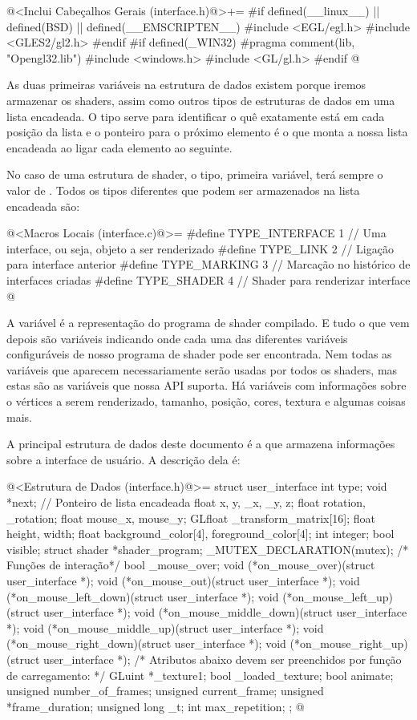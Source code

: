 \iniciocodigo
@<Inclui Cabeçalhos Gerais (interface.h)@>+=
#if defined(__linux__) || defined(BSD) || defined(__EMSCRIPTEN__)
#include <EGL/egl.h>
#include <GLES2/gl2.h>
#endif
#if defined(_WIN32)
#pragma comment(lib, "Opengl32.lib")
#include <windows.h>
#include <GL/gl.h>
#endif
@
\fimcodigo


As duas primeiras variáveis na estrutura de dados existem porque
iremos armazenar os shaders, assim como outros tipos de estruturas de
dados em uma lista encadeada. O tipo serve para identificar o quê
exatamente está em cada posição da lista e o ponteiro para o próximo
elemento é o que monta a nossa lista encadeada ao ligar cada elemento
ao seguinte.

No caso de uma estrutura de shader, o tipo, primeira variável, terá
sempre o valor de . Todos os tipos diferentes
que podem ser armazenados na lista encadeada são:

\iniciocodigo
@<Macros Locais (interface.c)@>=
#define TYPE_INTERFACE 1 // Uma interface, ou seja, objeto a ser renderizado
#define TYPE_LINK      2 // Ligação para interface anterior
#define TYPE_MARKING   3 // Marcação no histórico de interfaces criadas
#define TYPE_SHADER    4 // Shader para renderizar interface
@
\fimcodigo

A variável  é a representação do programa de
shader compilado. E tudo o que vem depois são variáveis indicando onde
cada uma das diferentes variáveis configuráveis de nosso programa de
shader pode ser encontrada. Nem todas as variáveis que aparecem
necessariamente serão usadas por todos os shaders, mas estas são as
variáveis que nossa API suporta. Há variáveis com informações sobre o
vértices a serem renderizado, tamanho, posição, cores, textura e
algumas coisas mais.


A principal estrutura de dados deste documento é a que armazena
informações sobre a interface de usuário. A descrição dela é:

\iniciocodigo
@<Estrutura de Dados (interface.h)@>=
struct user_interface{
  int type;
  void *next; // Ponteiro de lista encadeada
  float x, y, _x, _y, z;
  float rotation, _rotation;
  float mouse_x, mouse_y;
  GLfloat _transform_matrix[16];
  float height, width;
  float background_color[4], foreground_color[4];
  int integer;
  bool visible;
  struct shader *shader_program;
  _MUTEX_DECLARATION(mutex);
  /* Funções de interação*/
  bool _mouse_over;
  void (*on_mouse_over)(struct user_interface *);
  void (*on_mouse_out)(struct user_interface *);
  void (*on_mouse_left_down)(struct user_interface *);
  void (*on_mouse_left_up)(struct user_interface *);
  void (*on_mouse_middle_down)(struct user_interface *);
  void (*on_mouse_middle_up)(struct user_interface *);
  void (*on_mouse_right_down)(struct user_interface *);
  void (*on_mouse_right_up)(struct user_interface *);
  /* Atributos abaixo devem ser preenchidos por função de carregamento: */
  GLuint *_texture1;
  bool _loaded_texture;
  bool animate;
  unsigned number_of_frames;
  unsigned current_frame;
  unsigned *frame_duration;
  unsigned long _t;
  int max_repetition;
};
@
\fimcodigo

